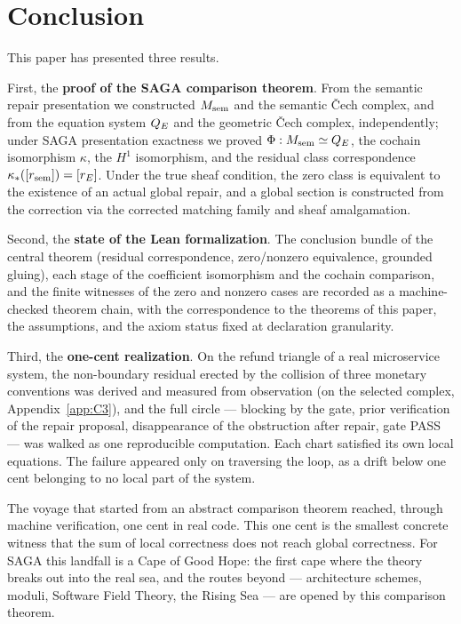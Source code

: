 \section{Conclusion}\label{sec:10}

This paper has presented three results.

First, the \textbf{proof of the SAGA comparison theorem}. From the
semantic repair presentation we constructed $M_{\mathrm{sem}}$ and the semantic
\v{C}ech complex, and from the equation system $Q_{E}$ and the geometric
\v{C}ech complex, independently; under SAGA presentation exactness we
proved $\Phi:M_{\mathrm{sem}}\simeq Q_{E}$, the cochain isomorphism $\kappa$, the
$H^1$ isomorphism, and the residual class correspondence
$\kappa_*([r_{\mathrm{sem}}])=[r_{E}]$. Under the true sheaf condition, the zero
class is equivalent to the existence of an actual global repair, and a
global section is constructed from the correction via the corrected
matching family and sheaf amalgamation.

Second, the \textbf{state of the Lean formalization}. The conclusion
bundle of the central theorem (residual correspondence, zero/nonzero
equivalence, grounded gluing), each stage of the coefficient
isomorphism and the cochain comparison, and the finite witnesses of
the zero and nonzero cases are recorded as a machine-checked theorem
chain, with the correspondence to the theorems of this paper, the
assumptions, and the axiom status fixed at declaration granularity.

Third, the \textbf{one-cent realization}. On the refund triangle of a
real microservice system, the non-boundary residual erected by the
collision of three monetary conventions was derived and measured from
observation (on the selected complex, Appendix~\ref{app:C3}), and the full
circle --- blocking by the gate, prior verification of the repair
proposal, disappearance of the obstruction after repair, gate PASS ---
was walked as one reproducible computation. Each chart satisfied its
own local equations. The failure appeared only on traversing the loop,
as a drift below one cent belonging to no local part of the system.

The voyage that started from an abstract comparison theorem reached,
through machine verification, one cent in real code. This one cent is
the smallest concrete witness that the sum of local correctness does
not reach global correctness. For SAGA this landfall is a Cape of Good
Hope: the first cape where the theory breaks out into the real sea,
and the routes beyond --- architecture schemes, moduli, Software Field
Theory, the Rising Sea --- are opened by this comparison theorem.
